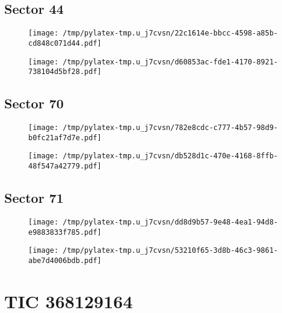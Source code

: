 \documentclass{report}%
\begin{document}
%
\subsection{Sector 44}%
\label{subsec:6776818144}%


\begin{figure}[H]%
\centering%
\centering%
\texttt{[image: /tmp/pylatex-tmp.u\_j7cvsn/22c1614e-bbcc-4598-a85b-cd848c071d44.pdf]}%
\end{figure}

%


\begin{figure}[H]%
\centering%
\texttt{[image: /tmp/pylatex-tmp.u\_j7cvsn/d60853ac-fde1-4170-8921-738104d5bf28.pdf]}%
\end{figure}

%
\subsection{Sector 70}%
\label{subsec:6776818170}%


\begin{figure}[H]%
\centering%
\centering%
\texttt{[image: /tmp/pylatex-tmp.u\_j7cvsn/782e8cdc-c777-4b57-98d9-b0fc21af7d7e.pdf]}%
\end{figure}

%


\begin{figure}[H]%
\centering%
\texttt{[image: /tmp/pylatex-tmp.u\_j7cvsn/db528d1c-470e-4168-8ffb-48f547a42779.pdf]}%
\end{figure}

%
\subsection{Sector 71}%
\label{subsec:6776818171}%


\begin{figure}[H]%
\centering%
\centering%
\texttt{[image: /tmp/pylatex-tmp.u\_j7cvsn/dd8d9b57-9e48-4ea1-94d8-e9883833f785.pdf]}%
\end{figure}

%


\begin{figure}[H]%
\centering%
\texttt{[image: /tmp/pylatex-tmp.u\_j7cvsn/53210f65-3d8b-46c3-9861-abe7d4006bdb.pdf]}%
\end{figure}

%
\section{TIC 368129164}%
\label{sec:TIC368129164}%
\end{document}
